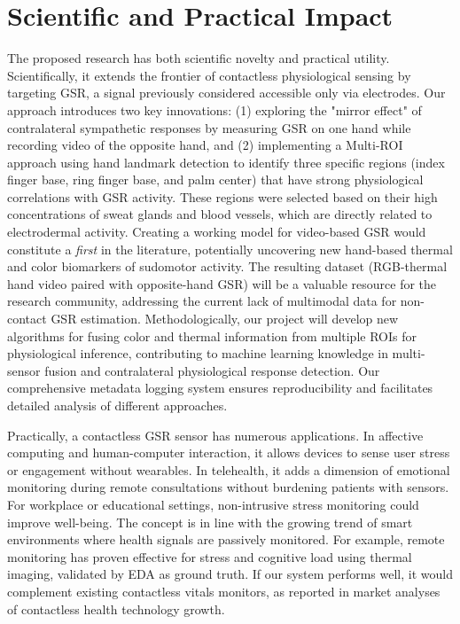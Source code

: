 \documentclass[12pt]{article}
\begin{document}
    \section{Scientific and Practical Impact}
    The proposed research has both scientific novelty and practical utility. Scientifically, it extends the frontier of contactless physiological sensing by targeting GSR, a signal previously considered accessible only via electrodes. Our approach introduces two key innovations: (1) exploring the "mirror effect" of contralateral sympathetic responses by measuring GSR on one hand while recording video of the opposite hand, and (2) implementing a Multi-ROI approach using hand landmark detection to identify three specific regions (index finger base, ring finger base, and palm center) that have strong physiological correlations with GSR activity. These regions were selected based on their high concentrations of sweat glands and blood vessels, which are directly related to electrodermal activity. Creating a working model for video-based GSR would constitute a \emph{first} in the literature, potentially uncovering new hand-based thermal and color biomarkers of sudomotor activity. The resulting dataset (RGB-thermal hand video paired with opposite-hand GSR) will be a valuable resource for the research community, addressing the current lack of multimodal data for non-contact GSR estimation. Methodologically, our project will develop new algorithms for fusing color and thermal information from multiple ROIs for physiological inference, contributing to machine learning knowledge in multi-sensor fusion and contralateral physiological response detection. Our comprehensive metadata logging system ensures reproducibility and facilitates detailed analysis of different approaches.

    Practically, a contactless GSR sensor has numerous applications. In affective computing and human-computer interaction, it allows devices to sense user stress or engagement without wearables. In telehealth, it adds a dimension of emotional monitoring during remote consultations without burdening patients with sensors. For workplace or educational settings, non-intrusive stress monitoring could improve well-being. The concept is in line with the growing trend of smart environments where health signals are passively monitored. For example, remote monitoring has proven effective for stress and cognitive load using thermal imaging, validated by EDA as ground truth. If our system performs well, it would complement existing contactless vitals monitors, as reported in market analyses of contactless health technology growth.
\end{document}
